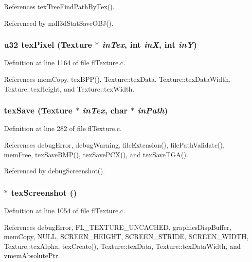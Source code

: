 References tex\-Tree\-Find\-Path\-By\-Tex().

Referenced by mdl3d\-Stat\-Save\-OBJ().
\subsubsection{\setlength{\rightskip}{0pt plus 5cm}u32 tex\-Pixel ({\bf Texture} $\ast$ {\em in\-Tex}, int {\em in\-X}, int {\em in\-Y})}\label{flTexture_8c_d448cd310f08ef57c369e1dfa10cfa3b}




Definition at line 1164 of file fl\-Texture.c.

References mem\-Copy, tex\-BPP(), Texture::tex\-Data, Texture::tex\-Data\-Width, Texture::tex\-Height, and Texture::tex\-Width.
\subsubsection{ tex\-Save ({\bf Texture} $\ast$ {\em in\-Tex}, char $\ast$ {\em in\-Path})}\label{flTexture_8c_42ef43dc0bebab5c836db2e1b9ec0962}




Definition at line 282 of file fl\-Texture.c.

References debug\-Error, debug\-Warning, file\-Extension(), file\-Path\-Validate(), mem\-Free, tex\-Save\-BMP(), tex\-Save\-PCX(), and tex\-Save\-TGA().

Referenced by debug\-Screenshot().
\subsubsection{$\ast$ tex\-Screenshot ()}\label{flTexture_8c_bba74e07093e026798aa20f44a390610}




Definition at line 1054 of file fl\-Texture.c.

References debug\-Error, FL\_\-TEXTURE\_\-UNCACHED, graphics\-Disp\-Buffer, mem\-Copy, NULL, SCREEN\_\-HEIGHT, SCREEN\_\-STRIDE, SCREEN\_\-WIDTH, Texture::tex\-Alpha, tex\-Create(), Texture::tex\-Data, Texture::tex\-Data\-Width, and vmem\-Absolute\-Ptr.

